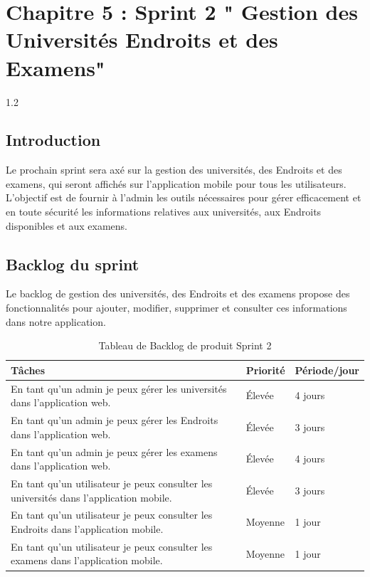 \chapter{ Chapitre  5  : Sprint 2 " Gestion \centering  des Universités Endroits et des Examens"}
\begin{spacing}{1.2}
\minitoc
\thispagestyle{MyStyle}
\end{spacing}
\newpage
\begin{sloppypar} 

\section{Introduction }
\vspace{-4mm}
Le prochain sprint sera axé sur la gestion des universités, des Endroits et des examens, qui seront affichés sur l'application mobile pour tous les utilisateurs. L’objectif est de fournir à l’admin les outils nécessaires pour gérer efficacement et en toute sécurité les informations relatives aux universités, aux Endroits disponibles et aux examens.
\vspace{-9mm}
\section{Backlog du sprint}
\vspace{-4mm}
Le backlog de gestion des universités, des Endroits et des examens propose des fonctionnalités pour ajouter, modifier, supprimer et consulter ces informations dans notre application.
\vspace{-4mm}
\begin{table}[H]
\centering
\begin{tabular}{|p{11cm}|p{2cm}|p{2.5cm}|}
\hline
\textbf{ Tâches } & \textbf{ Priorité }& \textbf{Période/jour}  \\
\hline
En tant qu’un admin je peux gérer  les universités dans l’application web.  & Élevée  & 4 jours  \\
\hline
En tant qu’un admin je peux gérer les Endroits dans l’application web.   & Élevée  & 3 jours  \\
\hline
En tant qu’un admin je peux gérer les examens dans l’application web. & Élevée & 4 jours \\
\hline
En tant qu’un utilisateur je peux consulter  les universités dans l’application mobile. & Élevée  & 3 jours \\
\hline
En tant qu’un utilisateur je peux consulter  les Endroits dans l’application mobile. & Moyenne & 1 jour\\
\hline
En tant qu’un utilisateur je peux consulter  les examens dans l’application mobile. & Moyenne & 1 jour\\
\hline
\end{tabular}
\caption{Tableau de Backlog de produit Sprint 2}
\end{table}


\end{sloppypar}
